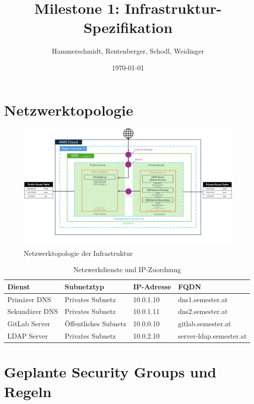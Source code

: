\documentclass[a4paper,12pt]{article}
\title{Milestone 1: Infrastruktur-Spezifikation}
\author{Hammerschmidt, Rentenberger, Schodl, Weidinger}
\date{\today}
\begin{document}
\maketitle
\tableofcontents
\newpage

\section{Netzwerktopologie}

\begin{figure}[h!]
	\centering
	\includegraphics[width=\textwidth]{data/DevOps_Network_Topology.png}
	\caption{Netzwerktopologie der Infrastruktur}
	\label{fig:network_topology}
\end{figure}

\begin{table}[h!]
	\centering
	\begin{tabular}{|l|l|l|l|}
		\hline
		\textbf{Dienst} & \textbf{Subnetztyp}  & \textbf{IP-Adresse} & \textbf{FQDN}           \\ \hline
		Primärer DNS    & Privates Subnetz     & 10.0.1.10           & dns1.semester.at        \\ \hline
		Sekundärer DNS  & Privates Subnetz     & 10.0.1.11           & dns2.semester.at        \\ \hline
		GitLab Server   & Öffentliches Subnetz & 10.0.0.10           & gitlab.semester.at      \\ \hline
		LDAP Server     & Privates Subnetz     & 10.0.2.10           & server-ldap.semester.at \\ \hline
	\end{tabular}
	\caption{Netzwerkdienste und IP-Zuordnung}
\end{table}

\newpage

\section{Geplante Security Groups und Regeln}
\end{document}
